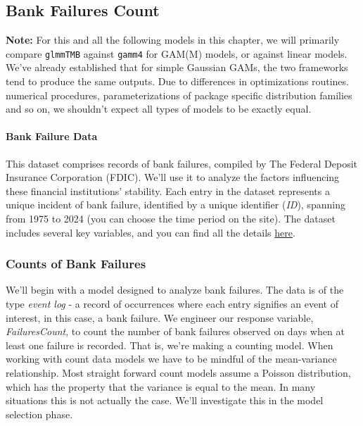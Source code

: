 \documentclass[12pt, twoside,hidelinks]{article}
\theoremstyle{definition}
\numberwithin{equation}{section}
\begin{document}
\subsection{Bank Failures Count}\label{sec:analysis:bank_fail_count}

\textbf{Note:} For this and all the following models in this chapter, we will primarily compare \texttt{glmmTMB} against \texttt{gamm4} for GAM(M) models, or against linear models. We've already established that for simple Gaussian GAMs, the two frameworks tend to produce the same outputs. Due to differences in optimizations routines. numerical procedures, parameterizations of package specific distribution families and so on, we shouldn't expect all types of models to be exactly equal.

\paragraph{Bank Failure Data}
This dataset comprises records of bank failures, compiled by The Federal Deposit Insurance Corporation (FDIC). We'll use it to analyze the factors influencing these financial institutions' stability. Each entry in the dataset represents a unique incident of bank failure, identified by a unique identifier (\textit{ID}), spanning from 1975 to 2024 (you can choose the time period on the site). The dataset includes several key variables, and you can find all the details \href{https://banks.data.fdic.gov/explore/failures?aggReport=detail&displayFields=NAME%2CCERT%2CFIN%2CCITYST%2CFAILDATE%2CSAVR%2CRESTYPE%2CCOST%2CRESTYPE1%2CCHCLASS1%2CQBFDEP%2CQBFASSET&endFailYear=2024&sortField=CERT&sortOrder=asc&startFailYear=1975}{here}.


\subsubsection{Counts of Bank Failures}

We'll begin with a model designed to analyze bank failures. The data is of the type \textit{event log} - a record of occurrences where each entry signifies an event of interest, in this case, a bank failure. We engineer our response variable, \textit{FailuresCount}, to count the number of bank failures observed on days when at least one failure is recorded. That is, we're making a counting model. When working with count data models we have to be mindful of the mean-variance relationship. Most straight forward count models assume a Poisson distribution, which has the property that the variance is equal to the mean. In many situations this is not actually the case. We'll investigate this in the model selection phase. 
\end{document}
